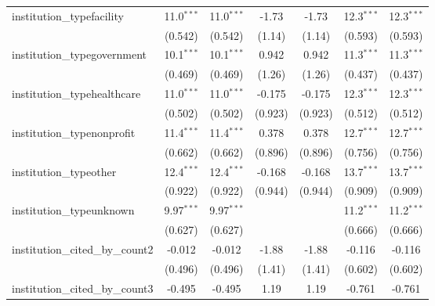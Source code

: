 \begin{tabular}{lcccccc}
   institution\_typefacility             & 11.0$^{***}$   & 11.0$^{***}$   & -1.73         & -1.73         & 12.3$^{***}$  & 12.3$^{***}$\\   
                                         & (0.542)        & (0.542)        & (1.14)        & (1.14)        & (0.593)       & (0.593)\\   
   institution\_typegovernment           & 10.1$^{***}$   & 10.1$^{***}$   & 0.942         & 0.942         & 11.3$^{***}$  & 11.3$^{***}$\\   
                                         & (0.469)        & (0.469)        & (1.26)        & (1.26)        & (0.437)       & (0.437)\\   
   institution\_typehealthcare           & 11.0$^{***}$   & 11.0$^{***}$   & -0.175        & -0.175        & 12.3$^{***}$  & 12.3$^{***}$\\   
                                         & (0.502)        & (0.502)        & (0.923)       & (0.923)       & (0.512)       & (0.512)\\   
   institution\_typenonprofit            & 11.4$^{***}$   & 11.4$^{***}$   & 0.378         & 0.378         & 12.7$^{***}$  & 12.7$^{***}$\\   
                                         & (0.662)        & (0.662)        & (0.896)       & (0.896)       & (0.756)       & (0.756)\\   
   institution\_typeother                & 12.4$^{***}$   & 12.4$^{***}$   & -0.168        & -0.168        & 13.7$^{***}$  & 13.7$^{***}$\\   
                                         & (0.922)        & (0.922)        & (0.944)       & (0.944)       & (0.909)       & (0.909)\\   
   institution\_typeunknown              & 9.97$^{***}$   & 9.97$^{***}$   &               &               & 11.2$^{***}$  & 11.2$^{***}$\\   
                                         & (0.627)        & (0.627)        &               &               & (0.666)       & (0.666)\\   
   institution\_cited\_by\_count2        & -0.012         & -0.012         & -1.88         & -1.88         & -0.116        & -0.116\\   
                                         & (0.496)        & (0.496)        & (1.41)        & (1.41)        & (0.602)       & (0.602)\\   
   institution\_cited\_by\_count3        & -0.495         & -0.495         & 1.19          & 1.19          & -0.761        & -0.761\\   

\end{tabular}
